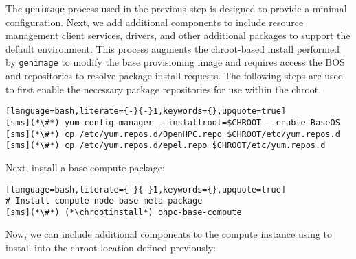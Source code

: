 
The \texttt{genimage} process used in the previous step is designed to provide a minimal \baseOS{} configuration. Next,
we add additional components to include resource management client services, \InfiniBand{} drivers, and other additional
packages to support the default \OHPC{} environment. This process augments the chroot-based install performed by
\texttt{genimage} to modify the base provisioning image and requires access the BOS and \OHPC{} repositories to resolve
package install requests. The following steps are used to first enable the necessary package repositories for use within
the chroot.

\begin{lstlisting}[language=bash,literate={-}{-}1,keywords={},upquote=true]
[sms](*\#*) yum-config-manager --installroot=$CHROOT --enable BaseOS
[sms](*\#*) cp /etc/yum.repos.d/OpenHPC.repo $CHROOT/etc/yum.repos.d
[sms](*\#*) cp /etc/yum.repos.d/epel.repo $CHROOT/etc/yum.repos.d
\end{lstlisting}

\noindent Next, install a base compute package:
\begin{lstlisting}[language=bash,literate={-}{-}1,keywords={},upquote=true]
# Install compute node base meta-package
[sms](*\#*) (*\chrootinstall*) ohpc-base-compute
\end{lstlisting}

\noindent Now, we can include additional components to the compute instance using
\texttt{\pkgmgr{}} to install into the chroot location defined previously:
